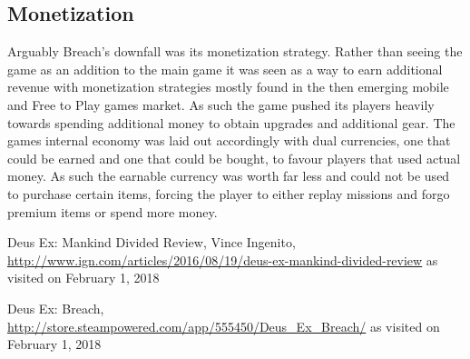 \documentclass[a4paper]{article}
\begin{document}
\subsection{Monetization}
Arguably Breach's downfall was its monetization strategy. Rather than seeing the game as an addition to the main game it was seen as a way to earn additional revenue with monetization strategies mostly found in the then emerging mobile and Free to Play games market. As such the game pushed its players heavily towards spending additional money to obtain upgrades and additional gear. The games internal economy was laid out accordingly with dual currencies, one that could be earned and one that could be bought, to favour players that used actual money. As such the earnable currency was worth far less and could not be used to purchase certain items, forcing the player to either replay missions and forgo premium items or spend more money.

\renewcommand{\refname}{\section{References and Further Sources}}
\begin{thebibliography}{1}

  Deus Ex: Mankind Divided Review,
  Vince Ingenito,
  \url{http://www.ign.com/articles/2016/08/19/deus-ex-mankind-divided-review}
  as visited on February 1, 2018

  Deus Ex: Breach,
  \url{http://store.steampowered.com/app/555450/Deus_Ex_Breach/}
  as visited on February 1, 2018


\end{thebibliography}
\end{document}
